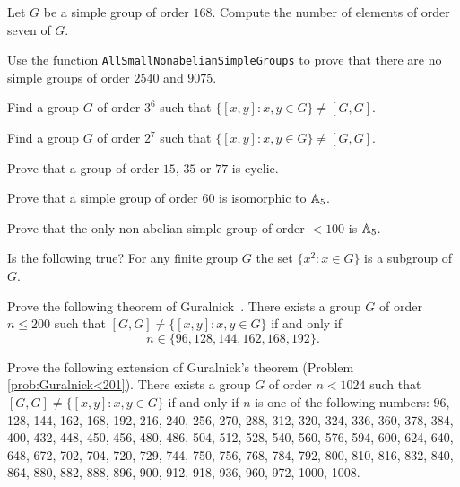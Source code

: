 \begin{prob}
  Let $G$ be a simple group of order $168$. Compute the number of elements of
  order seven of $G$.
\end{prob}

\begin{prob}
    Use the function \lstinline{AllSmallNonabelianSimpleGroups} to 
    prove that there are no simple groups of order $2540$ and $9075$.
\end{prob}

\begin{prob}
  Find a group $G$ of order $3^6$ such that 
  $\{[x,y]:x,y\in G\}\ne[G,G]$.
\end{prob}

\begin{prob}
  Find a group $G$ of order $2^7$ such that $\{[x,y]:x,y\in G\}\ne [G,G]$.
\end{prob}

\begin{prob}
  Prove that a group of order $15$, $35$ or $77$ is cyclic.
\end{prob}

\begin{prob}
  Prove that a simple group of order $60$ is isomorphic to $\mathbb{A}_5$.
\end{prob}

\begin{prob}
  Prove that the only non-abelian simple group of order $<100$ is $\mathbb{A}_5$.
\end{prob}

\begin{prob}
  Is the following true? For any finite group $G$ the set $\{x^2:x\in G\}$ is a
  subgroup of $G$.
\end{prob}



\begin{prob}
    \label{prob:Guralnick<201}
	Prove the following theorem of Guralnick~\cite{MR673806}. There exists
	a group $G$ of order $n\leq200$ such that $[G,G]\ne\{[x,y]:x,y\in G\}$
	if and only if
	\[
	  n\in\{96,128,144,162,168,192\}.
	\]
\end{prob}

\begin{prob}
    Prove the following extension of Guralnick's theorem (Problem
    \ref{prob:Guralnick<201}). There exists a group $G$ of order $n<1024$ such
    that $[G,G]\ne\{[x,y]:x,y\in G\}$ if and only if $n$ is one of the
    following numbers: 96, 128, 144, 162, 168, 192, 216, 240, 256, 270, 288,
    312, 320, 324, 336, 360, 378, 384, 400, 432, 448, 450, 456, 480, 486, 504,
    512, 528, 540, 560, 576, 594, 600, 624, 640, 648, 672, 702, 704, 720, 729,
    744, 750, 756, 768, 784, 792, 800, 810, 816, 832, 840, 864, 880, 882, 888,
    896, 900, 912, 918, 936, 960, 972, 1000, 1008.
\end{prob}


